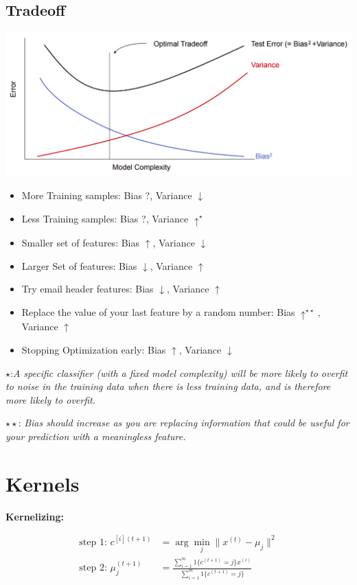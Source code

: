 \documentclass[8pt, a4paper, landscape, includeheadfoot]{extarticle}
\begin{document}
\begin{multicols*}{4}
	\subsection{Tradeoff}

	\begin{center}
		\includegraphics[width = 0.8\linewidth]{0_images/bias_variance_tradeoff.png}
	\end{center}
	\begin{itemize}
		\item More Training samples: Bias ?, Variance $\downarrow$
		\item Less Training samples: Bias ?, Variance $\uparrow^\star$
		\item Smaller set of features: Bias $\uparrow$, Variance $\downarrow$
		\item Larger Set of features: Bias $\downarrow$, Variance $\uparrow$
		\item Try email header features: Bias $\downarrow$, Variance $\uparrow$
		\item Replace the value of your last feature by a random number: Bias $\uparrow^{\star\star}$, Variance $\uparrow$
		\item Stopping Optimization early: Bias $\uparrow$, Variance $\downarrow$
	\end{itemize}
	$\star$:\textit{A specific classifier (with a fixed model complexity) will be more likely to overfit to noise in the training
		data when there is less training data, and is therefore more likely to overfit.}

	$\star\star$: \textit{Bias should increase as you are replacing information that could be useful for your
		prediction with a meaningless feature.}

	\section{Kernels}

	\textbf{Kernelizing:}

	\begin{align*}
		\text{step 1: } c^{[i](t+1)}  & = \arg\min_j \lVert x^{(t)} - \mu_j \rVert^2                                     \\
		\text{step 2: } \mu_j^{(t+1)} & = \frac{\sum_{i=1}^m 1\{c^{(t+1)} = j\}x^{(i)}}{\sum_{i=1}^m 1\{c^{(t+1)} = j\}}
	\end{align*}



\end{multicols*}
\end{document}
